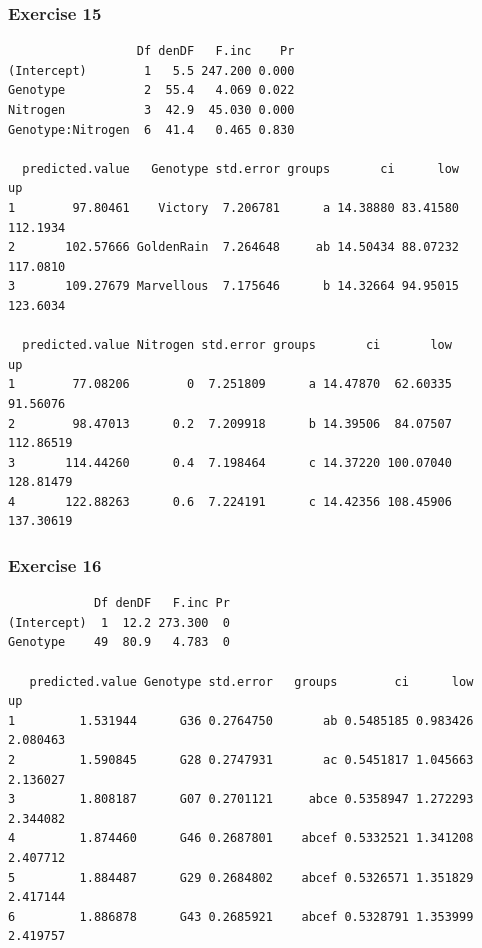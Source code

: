 
\begin{frame}[fragile]\frametitle{Exercise 15}
\begin{verbatim}
                  Df denDF   F.inc    Pr
(Intercept)        1   5.5 247.200 0.000
Genotype           2  55.4   4.069 0.022
Nitrogen           3  42.9  45.030 0.000
Genotype:Nitrogen  6  41.4   0.465 0.830

  predicted.value   Genotype std.error groups       ci      low       up
1        97.80461    Victory  7.206781      a 14.38880 83.41580 112.1934
2       102.57666 GoldenRain  7.264648     ab 14.50434 88.07232 117.0810
3       109.27679 Marvellous  7.175646      b 14.32664 94.95015 123.6034

  predicted.value Nitrogen std.error groups       ci       low        up
1        77.08206        0  7.251809      a 14.47870  62.60335  91.56076
2        98.47013      0.2  7.209918      b 14.39506  84.07507 112.86519
3       114.44260      0.4  7.198464      c 14.37220 100.07040 128.81479
4       122.88263      0.6  7.224191      c 14.42356 108.45906 137.30619

\end{verbatim}

\end{frame}



\begin{frame}[fragile]\frametitle{Exercise 16}
\begin{verbatim}
            Df denDF   F.inc Pr
(Intercept)  1  12.2 273.300  0
Genotype    49  80.9   4.783  0

   predicted.value Genotype std.error   groups        ci      low       up
1         1.531944      G36 0.2764750       ab 0.5485185 0.983426 2.080463
2         1.590845      G28 0.2747931       ac 0.5451817 1.045663 2.136027
3         1.808187      G07 0.2701121     abce 0.5358947 1.272293 2.344082
4         1.874460      G46 0.2687801    abcef 0.5332521 1.341208 2.407712
5         1.884487      G29 0.2684802    abcef 0.5326571 1.351829 2.417144
6         1.886878      G43 0.2685921    abcef 0.5328791 1.353999 2.419757
\end{verbatim}

\end{frame}


